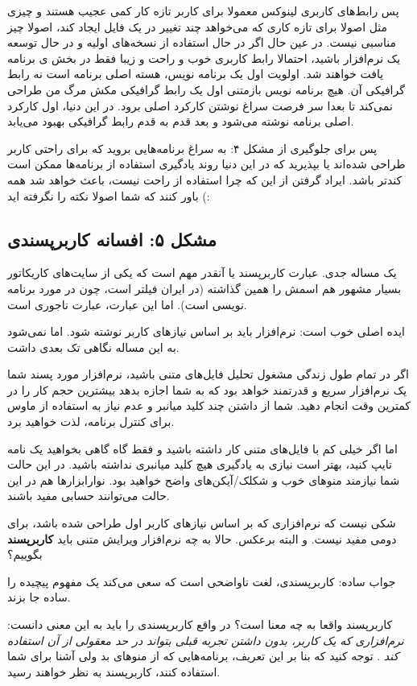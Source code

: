 پس رابط‌های کاربری لینوکس معمولا برای کاربر تازه کار کمی عجیب هستند و چیزی مثل 
اصولا برای تازه کاری که می‌خواهد چند تغییر در یک فایل ایجاد کند، اصولا چیز مناسبی نیست. در عین حال اگر در حال استفاده از نسخه‌های اولیه و در حال توسعه یک نرم‌افزار باشید، احتمالا رابط کاربری خوب و راحت و زیبا فقط در بخش 
ی برنامه یافت خواهند شد. اولویت اول یک برنامه نویس، هسته اصلی برنامه است نه رابط گرافیکی آن. هیچ برنامه نویس بازمتنی اول یک رابط گرافیکی مکش مرگ من طراحی نمی‌کند تا بعدا سر فرصت سراغ نوشتن کارکرد اصلی برود. در این دنیا، اول کارکرد اصلی برنامه نوشته می‌شود و بعد قدم به قدم رابط گرافیکی بهبود می‌یابد.

پس برای جلوگیری از مشکل ۴: به سراغ برنامه‌هایی بروید که برای راحتی کاربر طراحی شده‌اند یا بپذیرید که در این دنیا روند یادگیری استفاده از برنامه‌ها ممکن است کندتر باشد. ایراد گرفتن از این که چرا استفاده از 
راحت نیست، باعث خواهد شد همه باور کنند که شما اصولا نکته را نگرفته اید (:
\subsection*{مشکل ۵: افسانه کاربرپسندی}

یک مساله جدی. عبارت کاربرپسند یا 
 آنقدر مهم است که یکی از سایت‌های کاریکاتور بسیار مشهور هم اسمش را همین گذاشته (در ایران فیلتر است، چون در مورد برنامه نویسی است). اما این عبارت، عبارت ناجوری است.

ایده اصلی خوب است: نرم‌افزار باید بر اساس نیازهای کاربر نوشته شود. اما نمی‌شود به این مساله نگاهی تک بعدی داشت.

اگر در تمام طول زندگی‌ مشغول تحلیل فایل‌های متنی باشید، نرم‌افزار مورد پسند شما یک نرم‌افزار سریع و قدرتمند خواهد بود که به شما اجازه بدهد بیشترین حجم کار را در کمترین وقت انجام دهید. شما از داشتن چند کلید میانبر و عدم نیاز به استفاده از ماوس برای کنترل برنامه، لذت خواهید برد.

اما اگر خیلی کم با فایل‌های متنی کار داشته باشید و فقط گاه گاهی بخواهید یک نامه تایپ کنید، بهتر است نیازی به یادگیری هیچ کلید میانبری نداشته باشید. در این حالت شما نیازمند منوهای خوب و شکلک/آیکن‌های واضح خواهید بود. نوارابزارها هم در این حالت می‌توانند حسابی مفید باشند.

شکی نیست که نرم‌افزاری که بر اساس نیازهای کاربر اول طراحی شده باشد، برای دومی مفید نیست. و البته برعکس. حالا به چه نرم‌افزار ویرایش متنی باید
\textbf{کاربرپسند}
بگوییم؟

جواب ساده: کاربرپسندی، لغت ناواضحی است که سعی می‌کند یک مفهوم پیچیده را ساده جا بزند.

کاربرپسند واقعا به چه معنا است؟ در واقع کاربرپسندی را باید به این معنی دانست:
\emph{نرم‌افزاری که یک کاربر، بدون داشتن تجربه قبلی بتواند در حد معقولی از آن استفاده کند}
. توجه کنید که بنا بر این تعریف، برنامه‌هایی که از منوهای بد ولی آشنا برای شما استفاده کنند، کاربرپسند به نظر خواهند رسید.
